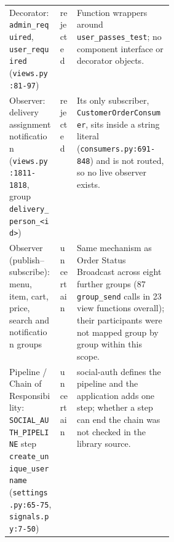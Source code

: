 \documentclass[11pt,a4paper]{article}
\newcommand{\code}[1]{\nolinkurl{#1}}
\begin{document}
\begin{xltabular}{\linewidth}{@{}p{0.31\linewidth}lX@{}}
Decorator: \code{admin_required}, \code{user_required} (\code{views.py:81-97}) & rejected & Function wrappers around \code{user_passes_test}; no component interface or decorator objects.\\
Observer: delivery assignment notification (\code{views.py:1811-1818}, group \code{delivery_person_<id>}) & rejected & Its only subscriber, \code{CustomerOrderConsumer}, sits inside a string literal (\code{consumers.py:691-848}) and is not routed, so no live observer exists.\\
Observer (publish--subscribe): menu, item, cart, price, search and notification groups & uncertain & Same mechanism as Order Status Broadcast across eight further groups (87 \code{group_send} calls in 23 view functions overall); their participants were not mapped group by group within this scope.\\
Pipeline / Chain of Responsibility: \code{SOCIAL_AUTH_PIPELINE} step \code{create_unique_username} (\code{settings.py:65-75}, \code{signals.py:7-50}) & uncertain & social-auth defines the pipeline and the application adds one step; whether a step can end the chain was not checked in the library source.\\\bottomrule
\end{xltabular}
\end{document}
